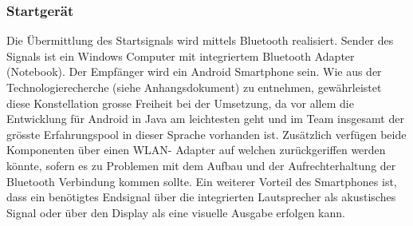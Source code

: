 \subsubsection{Startgerät}
Die Übermittlung des Startsignals wird mittels Bluetooth realisiert. 
Sender des Signals ist ein Windows Computer mit integriertem Bluetooth 
Adapter (Notebook). Der Empfänger wird ein Android Smartphone sein.
Wie aus der Technologierecherche (siehe Anhangsdokument) zu entnehmen, 
gewährleistet diese Konstellation grosse Freiheit bei der Umsetzung, 
da vor allem die Entwicklung für Android in Java am leichtesten geht 
und im Team insgesamt der grösste Erfahrungspool in dieser Sprache 
vorhanden ist. Zusätzlich verfügen beide Komponenten über einen WLAN-
Adapter auf welchen zurückgeriffen werden könnte, sofern es zu Problemen 
mit dem Aufbau  und der Aufrechterhaltung der Bluetooth Verbindung kommen 
sollte. Ein weiterer Vorteil des Smartphones ist, dass ein benötigtes 
Endsignal über die integrierten Lautsprecher  als akustisches Signal 
oder über den Display als eine visuelle Ausgabe erfolgen kann.
